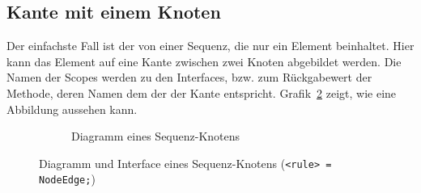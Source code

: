 \documentclass[../InterneDSLs.tex]{subfiles}
\begin{document}
\subsection{Kante mit einem Knoten}\label{SEC:OneNode}
Der einfachste Fall ist der von einer Sequenz, die nur ein Element beinhaltet. Hier kann das Element auf eine Kante zwischen zwei Knoten abgebildet werden. Die Namen der Scopes werden zu den Interfaces, bzw. zum Rückgabewert der Methode, deren Namen dem der der Kante entspricht. Grafik~\ref{FIG:OneElementNode} zeigt, wie eine Abbildung aussehen kann.
\begin{figure}[ht]
\centering
  \begin{subfigure}[c]{0.49\textwidth}
    \caption{Diagramm eines Sequenz-Knotens}
    \label{FIG:DiagramOneElementNode}
  \end{subfigure}
  \begin{subfigure}[c]{0.49\textwidth}
    
  \end{subfigure}
  \caption{Diagramm und Interface eines Sequenz-Knotens (\texttt{<rule> = NodeEdge;})}
  \label{FIG:OneElementNode}
\end{figure}
\end{document}
